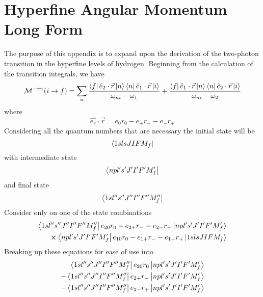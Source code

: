 \section{Hyperfine Angular Momentum Long Form}
The purpose of this appendix is to expand upon the derivation of the two-photon transition in the hyperfine levels of hydrogen. Beginning from the calculation of the transition integrals, we have
\begin{equation}
    \mathcal{M}^{-\gamma\gamma}(i\rightarrow f)=
    \sum_{n}
    \frac{
    \bra{f}\hat{e}_{2}\cdot
    \Vec{r}\ket{n}
    \bra{n}\hat{e}_{1}\cdot\Vec{r}\ket{i}}
    {\omega_{ni}-\omega_{1}}
    +
    \frac{
    \bra{f}\hat{e}_{1}\cdot\Vec{r}\ket{n}
    \bra{n}\hat{e}_{2}\cdot\Vec{r}\ket{i}}
    {\omega_{ni}-\omega_{2}}
\end{equation}
where
\begin{equation}
    \hat{e_r}\cdot\Vec{r}= e_0r_0-e_+r_--e_-r_+
\end{equation}
Considering all the quantum numbers that are necessary the initial state will be
\begin{equation}
    \bra{1s l s J I F M_f}
\end{equation}
with intermediate state
\begin{equation}
    \bra{np l's'J'I'F'M_f'}
\end{equation}
and final state
\begin{equation}
        \bra{1s l'' s'' J'' I'' F'' M_f''}
\end{equation}
Consider only on one of the state combinations
\begin{align}
\begin{split}
        \bra{1s l'' s'' J'' I'' F'' M_f''}
    e_{20}r_0-e_{2+}r_--e_{2-}r_+
    \ket{np l's'J'I'F'M_f'}\\
    \cross\bra{np l's'J'I'F'M_f'}
    e_{10}r_0-e_{1+}r_--e_{1-}r_+
    \ket{1s l s J I F M_f}
\end{split}
\end{align}
Breaking up these equations for ease of use into
\begin{align}
\begin{split}
    \bra{1s l'' s'' J'' I'' F'' M_f''}
    e_{20}r_0
    \ket{np l's'J'I'F'M_f'}\\
    -\bra{1s l'' s'' J'' I'' F'' M_f''}
    e_{2+}r_-
    \ket{np l's'J'I'F'M_f'}\\
    -\bra{1s l'' s'' J'' I'' F'' M_f''}
    e_{2-}r_+
    \ket{np l's'J'I'F'M_f'}
\end{split}
\end{align}
